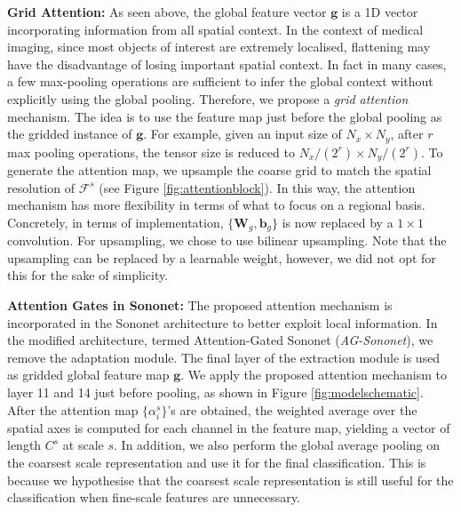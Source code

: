\documentclass{article}
\providecommand{\mb}[1]{\mathbf{#1}}
\begin{document}
\textbf{Grid Attention:} As seen above, the global feature vector $\mb{g}$ is a 1D vector incorporating information from all spatial context. In the context of medical imaging, since most objects of interest are extremely localised, flattening may have the disadvantage of losing important spatial context. In fact in many cases, a few max-pooling operations are sufficient to infer the global context without explicitly using the global pooling. Therefore, we propose a \emph{grid attention} mechanism. The idea is to use the feature map just before the global pooling as the gridded instance of $\mb{g}$. For example, given an input size of $N_x\times N_y$, after $r$ max pooling operations, the tensor size is reduced to $N_x / (2^r) \times N_y / (2^r)$. To generate the attention map, we upsample the coarse grid to match the spatial resolution of $\mathcal{F}^s$ (see Figure \ref{fig:attentionblock}). In this way, the attention mechanism has more flexibility in terms of what to focus on a regional basis. Concretely, in terms of implementation, $\{\mb{W}_g, \mb{b}_g\}$ is now replaced by a $1 \times 1$ convolution. For upsampling, we chose to use bilinear upsampling. Note that the upsampling can be replaced by a learnable weight, however, we did not opt for this for the sake of simplicity. 

\textbf{Attention Gates in Sononet:} The proposed attention mechanism is incorporated in the Sononet architecture to better exploit local information. In the modified architecture, termed Attention-Gated Sononet (\emph{AG-Sononet}), we remove the adaptation module. The final layer of the extraction module is used as gridded global feature map $\mb{g}$. We apply the proposed attention mechanism to layer 11 and 14 just before pooling, as shown in Figure \ref{fig:modelschematic}. After the attention map $\{\alpha_i^s\}$'s are obtained, the weighted average over the spatial axes is computed for each channel in the feature map, yielding a vector of length $C^s$ at scale $s$. In addition, we also perform the global average pooling on the coarsest scale representation and use it for the final classification. This is because we hypothesise that the coarsest scale representation is still useful for the classification when fine-scale features are unnecessary. 
\end{document}
